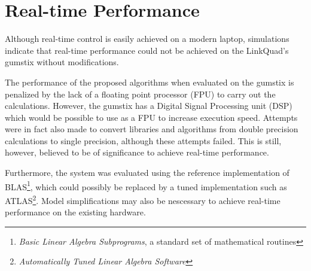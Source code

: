     \section{Real-time Performance}
        Although real-time control is easily achieved on a modern laptop,
        simulations indicate that real-time performance
        could not be achieved on the LinkQuad's gumstix without modifications.

        The performance of the proposed algorithms when evaluated on the
        gumstix is penalized by the lack of a floating point processor (FPU) to
        carry out the calculations. However, the gumstix has a
        Digital Signal Processing unit (DSP) which would be possible to
        use as a FPU to increase execution speed.
        Attempts were in fact also made to convert libraries and algorithms from
        double precision calculations to single precision, although these attempts failed.
        This is still, however, believed to be of significance to achieve real-time performance.

        Furthermore, the system was evaluated
        using the reference implementation of BLAS\footnote{\textit{Basic Linear Algebra Subprograms},
        a standard set of mathematical routines}, which could possibly
        be replaced by a tuned implementation such as ATLAS\footnote{\textit{Automatically Tuned Linear Algebra Software}}.
        Model simplifications may also be nescessary to achieve real-time performance
        on the existing hardware.
